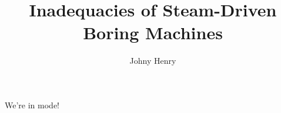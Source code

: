 \documentclass[subfig,blackref,approvalform]{drexel-thesis}
\author{Johny Henry}
\title{Inadequacies of Steam-Driven Boring Machines}
\begin{document}
\begin{DUTpreamble} %

\begin{dedications}
We're in  mode!

\Blindtext[3]
\end{dedications}

\begin{acknowledgments}
\Blindtext[3]
\end{acknowledgments}

\tableofcontents
\listoftables
\listoffigures

\begin{abstract}
\Blindtext[3]
\end{abstract}
\end{DUTpreamble}

\begin{thesis}

\end{thesis}



\appendix


\begin{vita}
\Blindtext[3]
\end{vita}
\end{document}
